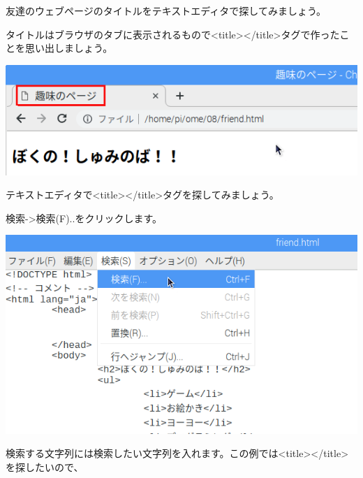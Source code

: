 \bigskip


\bigskip

\clearpage
友達のウェブページのタイトルをテキストエディタで探してみましょう。

タイトルはブラウザのタブに表示されるもので{\textless}title{\textgreater}{\textless}/title{\textgreater}タグで作ったことを思い出しましょう。



\begin{center}
\includegraphics[width=\textwidth]{./text08-img/textbook-img009.png}

\end{center}

\bigskip

テキストエディタで{\textless}title{\textgreater}{\textless}/title{\textgreater}タグを探してみましょう。

検索-{\textgreater}検索(F)..をクリックします。

\begin{center}
\includegraphics[width=\textwidth]{./text08-img/textbook-img010.png}

\end{center}
\clearpage
検索する文字列には検索したい文字列を入れます。この例では{\textless}title{\textgreater}{\textless}/title{\textgreater}を探したいので、


